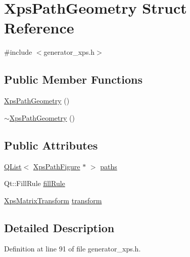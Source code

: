\hypertarget{structXpsPathGeometry}{\section{Xps\+Path\+Geometry Struct Reference}
\label{structXpsPathGeometry}
}


{\ttfamily \#include $<$generator\+\_\+xps.\+h$>$}

\subsection*{Public Member Functions}
\begin{DoxyCompactItemize}
\item 
\hyperlink{structXpsPathGeometry_aee87d58ca8466f0097ddd8468f23c405}{Xps\+Path\+Geometry} ()
\item 
\hyperlink{structXpsPathGeometry_a0408c90385c30adbaf421daa129bbd51}{$\sim$\+Xps\+Path\+Geometry} ()
\end{DoxyCompactItemize}
\subsection*{Public Attributes}
\begin{DoxyCompactItemize}
\item 
\hyperlink{classQList}{Q\+List}$<$ \hyperlink{structXpsPathFigure}{Xps\+Path\+Figure} $\ast$ $>$ \hyperlink{structXpsPathGeometry_a2623aacaaadb1ac2b4c7cb2c5ded4b7b}{paths}
\item 
Qt\+::\+Fill\+Rule \hyperlink{structXpsPathGeometry_a5588ce9b578b7557dab8a31d04e09fef}{fill\+Rule}
\item 
\hyperlink{generator__xps_8h_aebde53773a7daebe396ae625700469cc}{Xps\+Matrix\+Transform} \hyperlink{structXpsPathGeometry_a9ff5ab784e20e3a6fc70189f2bef8f72}{transform}
\end{DoxyCompactItemize}


\subsection{Detailed Description}


Definition at line 91 of file generator\+\_\+xps.\+h.



